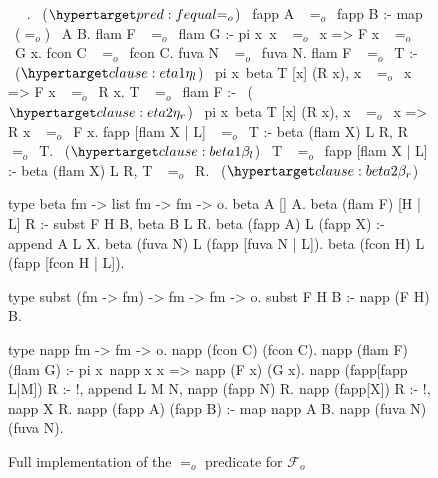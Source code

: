 \documentclass[sigconf,natbib=false]{acmart}
\newcommand{\EqualRel}{\ensuremath{=}}
\newcommand{\Eo}{\ensuremath{\EqualRel_o}\xspace}
\newcommand{\Fo}{\ensuremath{\mathcal{F}_{\!o}\xspace}} %
\begin{document}
\begin{figure*}
\begin{elpicode}
~ \PYG{n+nf}{(\Eo)} ~.                           ~($\customlabel{pred:fequal}{\Eo}$)~
fapp A ~\Eo~fapp B :- map ~(\Eo)~ A B.
flam F ~\Eo~flam G :- pi x\ x ~\Eo~x => F x ~\Eo~G x.
fcon C ~\Eo~fcon C.
fuva N ~\Eo~fuva N.
flam F ~\Eo~T :-                                       ~($\customlabel{clause:eta1}{\eta_l}$)~
  pi x\ beta T [x] (R x), x ~\Eo~x => F x ~\Eo~R x.
T ~\Eo~flam F :-                                       ~($\customlabel{clause:eta2}{\eta_r}$)~
  pi x\ beta T [x] (R x), x ~\Eo~x => R x ~\Eo~F x.
fapp [flam X | L] ~\Eo~T :- beta (flam X) L R, R ~\Eo~T. ~($\customlabel{clause:beta1}{\beta_l}$)~
T ~\Eo~fapp [flam X | L] :- beta (flam X) L R, T ~\Eo~R. ~($\customlabel{clause:beta2}{\beta_r}$)~

type beta fm -> list fm -> fm -> o.
beta A [] A.
beta (flam F) [H | L] R :- subst F H B,
  beta B L R. %
beta (fapp A) L (fapp X) :- append A L X.
beta (fuva N) L (fapp [fuva N | L]).
beta (fcon H) L (fapp [fcon H | L]).

type subst (fm -> fm) -> fm -> fm -> o.
subst F H B :- napp (F H) B. %

type napp fm -> fm -> o.
napp (fcon C) (fcon C).
napp (flam F) (flam G) :- pi x\ napp x x => napp (F x) (G x).
napp (fapp[fapp L|M]) R :- !, append L M N, napp (fapp N) R.
napp (fapp[X]) R :- !, napp X R.
napp (fapp A) (fapp B) :- map napp A B.
napp (fuva N) (fuva N).
\end{elpicode}
\caption{Full implementation of the \Eo predicate for \Fo}
\label{code:eo-pred}
\end{figure*}
\end{document}
